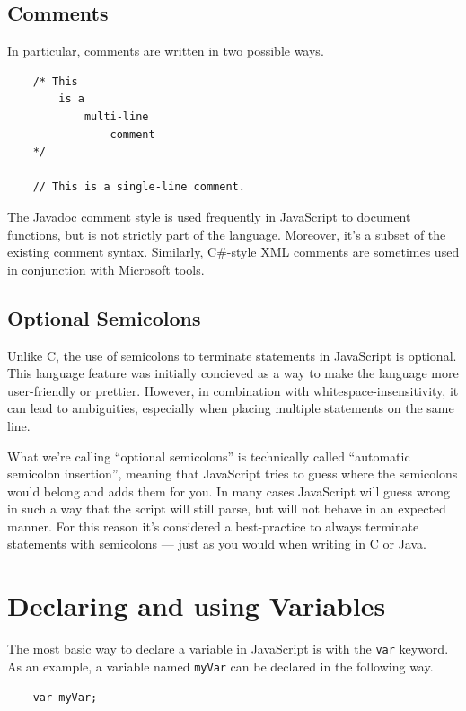 \documentclass[11pt,letter]{book}
\begin{document}
    \subsection{Comments}
    In particular, comments are written in two possible ways.
    
    \begin{verbatim}
    /* This
        is a
            multi-line
                comment
    */
     
    // This is a single-line comment.
    \end{verbatim}
    
    The Javadoc comment style is used frequently in JavaScript to document functions, but is not 
    strictly part of the language. Moreover, it's a subset of the existing comment syntax. 
    Similarly, C\#-style XML comments are sometimes used in conjunction with Microsoft tools.
    
    \subsection{Optional Semicolons}
    Unlike C, the use of semicolons to terminate statements in JavaScript is optional. This language 
    feature was initially concieved as a way to make the language more user-friendly or prettier. 
    However, in combination with whitespace-insensitivity, it can lead to ambiguities, especially 
    when placing multiple statements on the same line.
    
    What we're calling ``optional semicolons'' is technically called ``automatic semicolon 
    insertion'', meaning that JavaScript tries to guess where the semicolons would belong and adds 
    them for you. In many cases JavaScript will guess wrong in such a way that the script will 
    still parse, but will not behave in an expected manner. For this reason it's considered a
    best-practice to always terminate statements with semicolons --- just as you would when writing 
    in C or Java. 
    
    \section{Declaring and using Variables}
    The most basic way to declare a variable in JavaScript is with the \texttt{var} keyword. As an 
    example, a variable named \texttt{myVar} can be declared in the following way.
    
    \begin{verbatim}
    var myVar;
    \end{verbatim}
    
\end{document}
